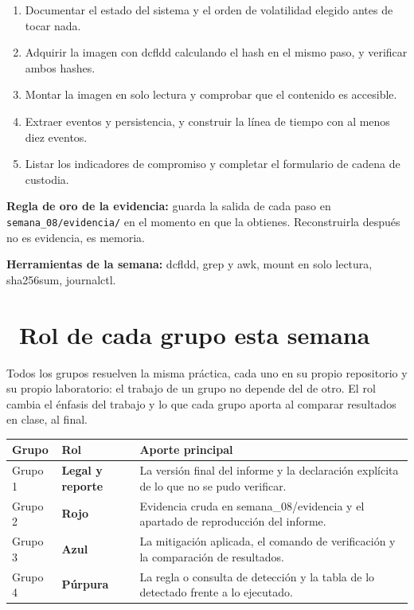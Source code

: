 \documentclass[11pt,a4paper]{article}
\newcommand{\iconotexto}[2]{\textcolor{cyanNeon}{\faIcon{#1}}~#2}
\begin{document}
\begin{enumerate}[leftmargin=1.4em,itemsep=2pt,topsep=3pt]
  \item Documentar el estado del sistema y el orden de volatilidad elegido antes de tocar nada.
  \item Adquirir la imagen con dcfldd calculando el hash en el mismo paso, y verificar ambos hashes.
  \item Montar la imagen en solo lectura y comprobar que el contenido es accesible.
  \item Extraer eventos y persistencia, y construir la línea de tiempo con al menos diez eventos.
  \item Listar los indicadores de compromiso y completar el formulario de cadena de custodia.
\end{enumerate}

\begin{cajaConcepto}\textbf{Regla de oro de la evidencia:} guarda la salida de cada paso en \texttt{semana\_08/evidencia/} en el momento en que la obtienes. Reconstruirla después no es evidencia, es memoria.
\end{cajaConcepto}

\textbf{Herramientas de la semana:} dcfldd, grep y awk, mount en solo lectura, sha256sum, journalctl.

\section{\iconotexto{users}{Rol de cada grupo esta semana}}

Todos los grupos resuelven la misma práctica, cada uno en su propio repositorio y su propio laboratorio: el trabajo de un grupo no depende del de otro. El rol cambia el énfasis del trabajo y lo que cada grupo aporta al comparar resultados en clase, al final.

\begin{tabularx}{\linewidth}{@{}l l X@{}}
\toprule
Grupo & Rol & Aporte principal\\
\midrule
Grupo 1 & \textbf{Legal y reporte} & La versión final del informe y la declaración explícita de lo que no se pudo verificar. \\
Grupo 2 & \textbf{Rojo} & Evidencia cruda en semana\_08/evidencia y el apartado de reproducción del informe. \\
Grupo 3 & \textbf{Azul} & La mitigación aplicada, el comando de verificación y la comparación de resultados. \\
Grupo 4 & \textbf{Púrpura} & La regla o consulta de detección y la tabla de lo detectado frente a lo ejecutado. \\
\bottomrule
\end{tabularx}
\end{document}
